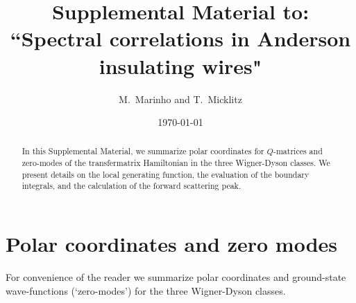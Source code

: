 \documentclass[twocolumn,showpacs,aps,prl]{revtex4}
\begin{document}
\title{Supplemental Material to:
``Spectral correlations in Anderson insulating wires" 
}

\author{M.~Marinho and  T.~Micklitz}


\date{\today}





\begin{abstract}

In this Supplemental Material, we summarize polar coordinates for $Q$-matrices 
and zero-modes of the transfermatrix Hamiltonian in the three Wigner-Dyson classes. 
We present details on the local generating function, the evaluation 
of the boundary integrals, and the calculation of the forward scattering peak. 


\end{abstract}


\maketitle




\section{Polar coordinates and zero modes}

For convenience of the reader we  
summarize polar coordinates and ground-state wave-functions (`zero-modes') 
for the three Wigner-Dyson classes. 
\end{document}
